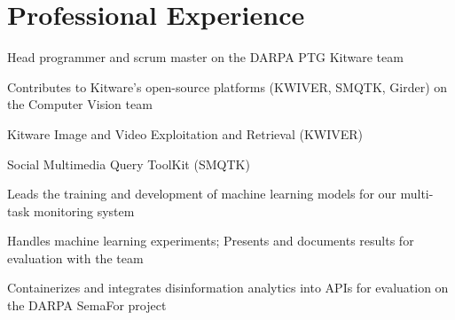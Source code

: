\documentclass[]{deedy-resume-openfont}
\begin{document}
%
%

%
%


%
%

\begin{minipage}[t]{0.7\textwidth} 


\section{Professional Experience}

\sectionsep
\begin{tightemize}
\item Head programmer and scrum master on the DARPA PTG Kitware team
\item Contributes to Kitware’s open-source platforms (KWIVER, SMQTK, Girder) on the Computer Vision team
    \vspace{3pt}
    \begin{tightemize}
    \item Kitware Image and Video Exploitation and Retrieval (KWIVER)
    \item Social Multimedia Query ToolKit (SMQTK)
    \end{tightemize}
    \vspace{5pt}
\item Leads the training and development of machine learning models for our multi-task monitoring system 
\item Handles machine learning experiments; Presents and documents results for evaluation with the team
\item Containerizes and integrates disinformation analytics into APIs for evaluation on the DARPA SemaFor project

\end{tightemize}
\sectionsep


\end{minipage}
\end{document}
